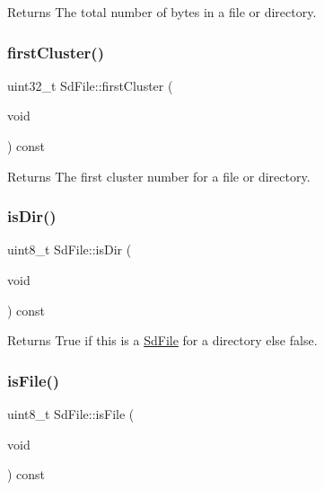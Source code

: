 \begin{DoxyReturn}{Returns}
The total number of bytes in a file or directory. 
\end{DoxyReturn}
\mbox{\label{class_sd_file_a854b7555bd774ff668558bf919636edd}} 
\subsubsection{\texorpdfstring{first\+Cluster()}{firstCluster()}}
{\footnotesize\ttfamily uint32\+\_\+t Sd\+File\+::first\+Cluster (\begin{DoxyParamCaption}\item[{void}]{ }\end{DoxyParamCaption}) const\hspace{0.3cm}{\ttfamily [inline]}}

\begin{DoxyReturn}{Returns}
The first cluster number for a file or directory. 
\end{DoxyReturn}
\mbox{\label{class_sd_file_a564e69a08c11f20e66eb18c38e24b748}} 
\subsubsection{\texorpdfstring{is\+Dir()}{isDir()}}
{\footnotesize\ttfamily uint8\+\_\+t Sd\+File\+::is\+Dir (\begin{DoxyParamCaption}\item[{void}]{ }\end{DoxyParamCaption}) const\hspace{0.3cm}{\ttfamily [inline]}}

\begin{DoxyReturn}{Returns}
True if this is a \hyperlink{class_sd_file}{Sd\+File} for a directory else false. 
\end{DoxyReturn}
\mbox{\label{class_sd_file_ad9ca9b2b519a933c25e8f893ee0201b6}} 
\subsubsection{\texorpdfstring{is\+File()}{isFile()}}
{\footnotesize\ttfamily uint8\+\_\+t Sd\+File\+::is\+File (\begin{DoxyParamCaption}\item[{void}]{ }\end{DoxyParamCaption}) const\hspace{0.3cm}{\ttfamily [inline]}}

